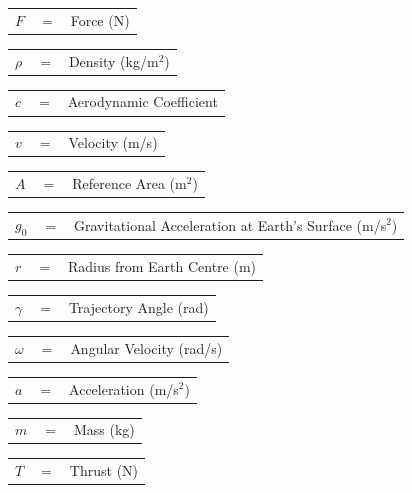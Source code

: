 \documentclass[]{aiaa-tc}
\begin{document}
	  	\begin{tabular}{p{1.2cm}p{1cm}p{5cm}}
	  $F$ & $=$ & Force (N)\\
	  	\end{tabular} 
	  	\begin{tabular}{p{1.2cm}p{1cm}p{5cm}}
	  $\rho$ & $=$ & Density (kg/m$^2$)\\
	  	\end{tabular} 
	  	\begin{tabular}{p{1.2cm}p{1cm}p{5cm}}
	  $c$ & $=$ & Aerodynamic Coefficient\\
	  	\end{tabular} 
	  	\begin{tabular}{p{1.2cm}p{1cm}p{5cm}}
	  $v$ & $=$ & Velocity (m/s)\\
	  	\end{tabular} 
	  	\begin{tabular}{p{1.2cm}p{1cm}p{5cm}}
	  $A$ & $=$ & Reference Area (m$^2$)\\
	  	\end{tabular} 
	  	\begin{tabular}{p{1.2cm}p{1cm}p{5cm}}
	  		$g_0$ & $=$ & Gravitational Acceleration at Earth's Surface (m/s$^2$)\\
	  	\end{tabular} 
	  	\begin{tabular}{p{1.2cm}p{1cm}p{5cm}}

	
	$r$ & $=$ & Radius from Earth Centre (m)\\
		\end{tabular} 
		\begin{tabular}{p{1.2cm}p{1cm}p{5cm}}
	  $\gamma$ & $=$ & Trajectory Angle (rad)\\
	  	\end{tabular} 
	  	\begin{tabular}{p{1.2cm}p{1cm}p{5cm}}
	  $\omega$ & $=$ & Angular Velocity (rad/s)\\
	  	\end{tabular} 
	  	\begin{tabular}{p{1.2cm}p{1cm}p{5cm}}
	  $a$ & $=$ & Acceleration (m/s$^2$)\\
	  	\end{tabular} 
	  	\begin{tabular}{p{1.2cm}p{1cm}p{5cm}}
	  $m$ & $=$ & Mass (kg)\\
	  	\end{tabular} 
	  	\begin{tabular}{p{1.2cm}p{1cm}p{5cm}}
	  $T$ & $=$ & Thrust (N)\\
	  	\end{tabular} 
\end{document}
